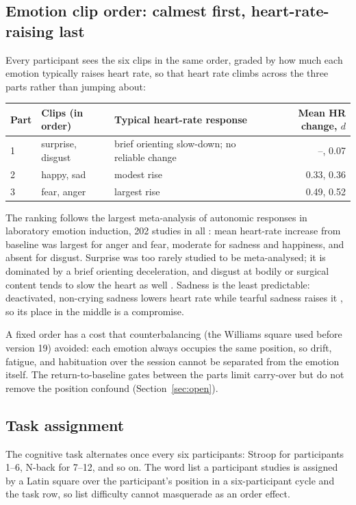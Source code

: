 \documentclass[11pt,a4paper]{article}
\begin{document}
\subsection*{Emotion clip order: calmest first, heart-rate-raising last}
Every participant sees the six clips in the same order, graded by how much each emotion typically raises heart rate,
so that heart rate climbs across the three parts rather than jumping about:

\begin{center}\small
\begin{tabular}{@{}lllr@{}}
\toprule
Part & Clips (in order) & Typical heart-rate response & Mean HR change, $d$ \\
\midrule
1 & surprise, disgust & brief orienting slow-down; no reliable change & --, 0.07 \\
2 & happy, sad & modest rise & 0.33, 0.36 \\
3 & fear, anger & largest rise & 0.49, 0.52 \\
\bottomrule
\end{tabular}
\end{center}

The ranking follows the largest meta-analysis of autonomic responses in laboratory emotion induction, 202 studies in
all \cite{siegel2018}: mean heart-rate increase from baseline was largest for anger and fear, moderate for sadness
and happiness, and absent for disgust. Surprise was too rarely studied to be meta-analysed; it is dominated by a
brief orienting deceleration, and disgust at bodily or surgical content tends to slow the heart as well
\cite{kreibig2010}. Sadness is the least predictable: deactivated, non-crying sadness lowers heart rate while
tearful sadness raises it \cite{kreibig2010}, so its place in the middle is a compromise.

A fixed order has a cost that counterbalancing (the Williams square used before version 19) avoided: each emotion
always occupies the same position, so drift, fatigue, and habituation over the session cannot be separated from the
emotion itself. The return-to-baseline gates between the parts limit carry-over but do not remove the position
confound (Section~\ref{sec:open}).

\subsection*{Task assignment}
The cognitive task alternates once every six participants: Stroop for participants 1--6, N-back for 7--12, and so
on. The word list a participant studies is assigned by a Latin square over the
participant's position in a six-participant cycle and the task row, so list difficulty cannot masquerade as an
order effect.
\end{document}
